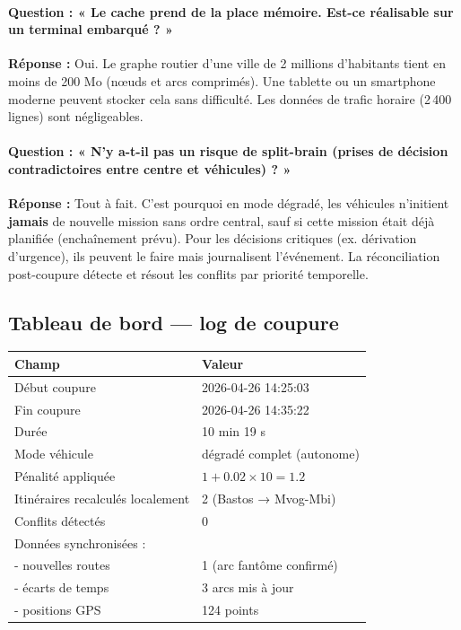 \documentclass[12pt,a4paper]{article}
\theoremstyle{definition}
\theoremstyle{remark}
\begin{document}
\paragraph{Question : « Le cache prend de la place mémoire. Est-ce
réalisable sur un terminal embarqué ? »}
\textbf{Réponse :} Oui. Le graphe routier d’une ville de 2 millions
d’habitants tient en moins de 200 Mo (nœuds et arcs comprimés). Une
tablette ou un smartphone moderne peuvent stocker cela sans difficulté.
Les données de trafic horaire (2\,400 lignes) sont négligeables.

\paragraph{Question : « N’y a-t-il pas un risque de split-brain
(prises de décision contradictoires entre centre et véhicules) ? »}
\textbf{Réponse :} Tout à fait. C’est pourquoi en mode dégradé,
les véhicules n’initient \textbf{jamais} de nouvelle mission sans
ordre central, sauf si cette mission était déjà planifiée (enchaînement
prévu). Pour les décisions critiques (ex. dérivation d’urgence), ils
peuvent le faire mais journalisent l’événement. La réconciliation
post-coupure détecte et résout les conflits par priorité temporelle.

\subsection{Tableau de bord — log de coupure}

\begin{center}
\begin{tabular}{ll}
  \toprule
  \textbf{Champ} & \textbf{Valeur} \\
  \midrule
  Début coupure & 2026-04-26 14:25:03 \\
  Fin coupure   & 2026-04-26 14:35:22 \\
  Durée         & 10 min 19 s \\
  Mode véhicule & dégradé complet (autonome) \\
  Pénalité appliquée & $1 + 0.02 \times 10 = 1.2$ \\
  Itinéraires recalculés localement & 2 (Bastos → Mvog-Mbi) \\
  Conflits détectés & 0 \\
  Données synchronisées : & \\
  - nouvelles routes & 1 (arc fantôme confirmé) \\
  - écarts de temps & 3 arcs mis à jour \\
  - positions GPS & 124 points \\
  \bottomrule
\end{tabular}
\end{center}
\end{document}
